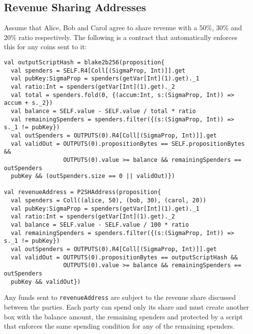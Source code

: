 \documentclass[11pt]{article}
\begin{document}
\subsection{Revenue Sharing Addresses}

Assume that Alice, Bob and Carol agree to share revenue with a 50\%, 30\% and 20\% ratio respectively. The following is a contract that automatically enforces this for any coins sent to it:


\begin{verbatim}
val outputScriptHash = blake2b256(proposition{
  val spenders = SELF.R4[Coll[(SigmaProp, Int)]].get
  val pubKey:SigmaProp = spenders(getVar[Int](1).get)._1
  val ratio:Int = spenders(getVar[Int](1).get)._2
  val total = spenders.fold(0, {(accum:Int, s:(SigmaProp, Int)) => accum + s._2})
  val balance = SELF.value - SELF.value / total * ratio
  val remainingSpenders = spenders.filter({(s:(SigmaProp, Int)) => s._1 != pubKey})
  val outSpenders = OUTPUTS(0).R4[Coll[(SigmaProp, Int)]].get
  val validOut = OUTPUTS(0).propositionBytes == SELF.propositionBytes &&
                 OUTPUTS(0).value >= balance && remainingSpenders == outSpenders
  pubKey && (outSpenders.size == 0 || validOut)})

val revenueAddress = P2SHAddress(proposition{
  val spenders = Coll((alice, 50), (bob, 30), (carol, 20))
  val pubKey:SigmaProp = spenders(getVar[Int](1).get)._1
  val ratio:Int = spenders(getVar[Int](1).get)._2
  val balance = SELF.value - SELF.value / 100 * ratio
  val remainingSpenders = spenders.filter({(s:(SigmaProp, Int)) => s._1 != pubKey})
  val outSpenders = OUTPUTS(0).R4[Coll[(SigmaProp, Int)]].get
  val validOut = OUTPUTS(0).propositionBytes == outputScriptHash &&
                 OUTPUTS(0).value >= balance && remainingSpenders == outSpenders
  pubKey && validOut})
\end{verbatim}

Any funds sent to \texttt{revenueAddress} are subject to the revenue share discussed between the parties. 
Each party can spend only its share and must create another box with the balance amount, the remaining spenders and protected by a script that enforces the same spending condition for any of the remaining spenders.
\end{document}
